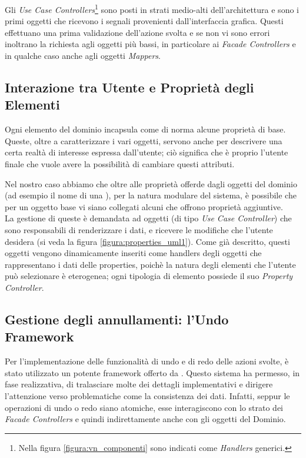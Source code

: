 Gli \emph{Use Case Controllers}\footnote{Nella figura \ref{figura:vn_componenti} sono indicati come \emph{Handlers} generici.} sono posti in strati medio-alti dell'architettura e sono i primi oggetti che ricevono i segnali provenienti dall'interfaccia grafica. Questi effettuano una prima validazione dell'azione svolta e se non vi sono errori inoltrano la richiesta agli oggetti più bassi, in particolare ai \emph{Facade Controllers} e in qualche caso anche agli oggetti \emph{Mappers}.


\subsection{Interazione tra Utente e Proprietà degli Elementi}
Ogni elemento del dominio incapsula come di norma alcune proprietà di base. Queste, oltre a caratterizzare i vari oggetti, servono anche per descrivere una certa realtà di interesse espressa dall'utente; ciò significa che è proprio l'utente finale che vuole avere la possibilità di cambiare questi attributi.

Nel nostro caso abbiamo che oltre alle proprietà offerde dagli oggetti del dominio (ad esempio il nome di una \virtualmachine{}), per la natura modulare del sistema, è possibile che per un oggetto base vi siano collegati alcuni \plugin{} che offrono proprietà aggiuntive.\\
La gestione di queste è demandata ad oggetti (di tipo \emph{Use Case Controller}) che sono responsabili di renderizzare i dati, e ricevere le modifiche che l'utente desidera (si veda la figura \ref{figura:properties_uml1}). Come già descritto, questi oggetti vengono dinamicamente inseriti come handlers degli oggetti che rappresentano i dati delle properties, poichè la natura degli elementi che l'utente può selezionare è eterogenea; ogni tipologia di elemento possiede il suo \emph{Property Controller}.

\subsection{Gestione degli annullamenti: l'Undo Framework}
Per l'implementazione delle funzionalità di undo e di redo delle azioni svolte, è stato utilizzato un potente framework offerto da \qt{}. Questo sistema ha permesso, in fase realizzativa, di tralasciare molte dei dettagli implementativi e dirigere l'attenzione verso problematiche come la consistenza dei dati. Infatti, seppur le operazioni di undo o redo siano atomiche, esse interagiscono con lo strato dei \emph{Facade Controllers} e quindi indirettamente anche con gli oggetti del Dominio.

